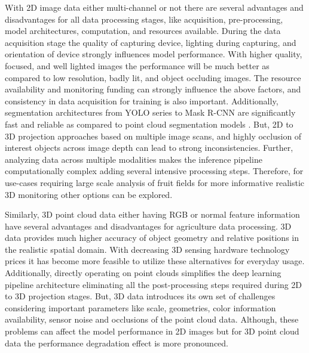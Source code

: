 \documentclass{article}
\begin{document}
With 2D image data either multi-channel or not there are several advantages and disadvantages for all data processing stages, like acquisition, pre-processing, model architectures, computation, and resources available.
During the data acquisition stage the quality of capturing device, lighting during capturing, and orientation of device strongly influences model performance. 
With higher quality, focused, and well lighted images the performance will be much better as compared to low resolution, badly lit, and object occluding images.
The resource availability and monitoring funding can strongly influence the above factors, and consistency in data acquisition for training is also important.
Additionally, segmentation architectures from YOLO series to Mask R-CNN are significantly fast and reliable as compared to point cloud segmentation models \cite{redmon2016you}.
But, 2D to 3D projection approaches based on multiple image scans, and highly occlusion of interest objects across image depth can lead to strong inconsistencies.
Further, analyzing data across multiple modalities makes the inference pipeline computationally complex adding several intensive processing steps.
Therefore, for use-cases requiring large scale analysis of fruit fields for more informative realistic 3D monitoring other options can be explored.


Similarly, 3D point cloud data either having RGB or normal feature information have several advantages and disadvantages for agriculture data processing.
3D data provides much higher accuracy of object geometry and relative positions in the realistic spatial domain.
With decreasing 3D sensing hardware technology prices it has become more feasible to utilize these alternatives for everyday usage.
Additionally, directly operating on point clouds simplifies the deep learning pipeline architecture eliminating all the post-processing steps required during 2D to 3D projection stages.
But, 3D data introduces its own set of challenges considering important parameters like scale, geometries, color information availability, sensor noise and occlusions of the point cloud data.
Although, these problems can affect the model performance in 2D images but for 3D point cloud data the performance degradation effect is more pronounced.
\end{document}

